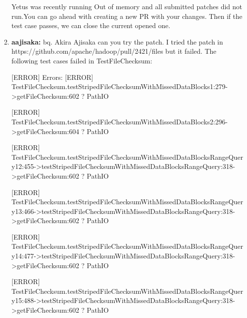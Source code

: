 \documentclass{report}%
\begin{document}
\begin{enumerate}
\newline%
\newline%
\newline%
Yetus was recently running Out of memory and all submitted patches did not run.You can go ahead\newline%
\newline%
with creating a new PR with your changes. Then if the test case passes, we can close the current opened one.\newline%
\newline%
\newline%
\newline%
%
\item%
\textbf{aajisaka: }bq. Akira Ajisaka can you try the patch.\newline%
\newline%
\newline%
\newline%
I tried the patch in https://github.com/apache/hadoop/pull/2421/files but it failed.\newline%
\newline%
\newline%
\newline%
The following test cases failed in TestFileChecksum:\newline%
\newline%
\begin{spverbatim}

[ERROR] Errors:
[ERROR]   TestFileChecksum.testStripedFileChecksumWithMissedDataBlocks1:279->getFileChecksum:602 ? PathIO

[ERROR]   TestFileChecksum.testStripedFileChecksumWithMissedDataBlocks2:296->getFileChecksum:604 ? PathIO

[ERROR]   TestFileChecksum.testStripedFileChecksumWithMissedDataBlocksRangeQuery12:455->testStripedFileChecksumWithMissedDataBlocksRangeQuery:318->getFileChecksum:602 ? PathIO

[ERROR]   TestFileChecksum.testStripedFileChecksumWithMissedDataBlocksRangeQuery13:466->testStripedFileChecksumWithMissedDataBlocksRangeQuery:318->getFileChecksum:602 ? PathIO

[ERROR]   TestFileChecksum.testStripedFileChecksumWithMissedDataBlocksRangeQuery14:477->testStripedFileChecksumWithMissedDataBlocksRangeQuery:318->getFileChecksum:602 ? PathIO

[ERROR]   TestFileChecksum.testStripedFileChecksumWithMissedDataBlocksRangeQuery15:488->testStripedFileChecksumWithMissedDataBlocksRangeQuery:318->getFileChecksum:602 ? PathIO


\end{spverbatim}
\end{enumerate}
\end{document}
